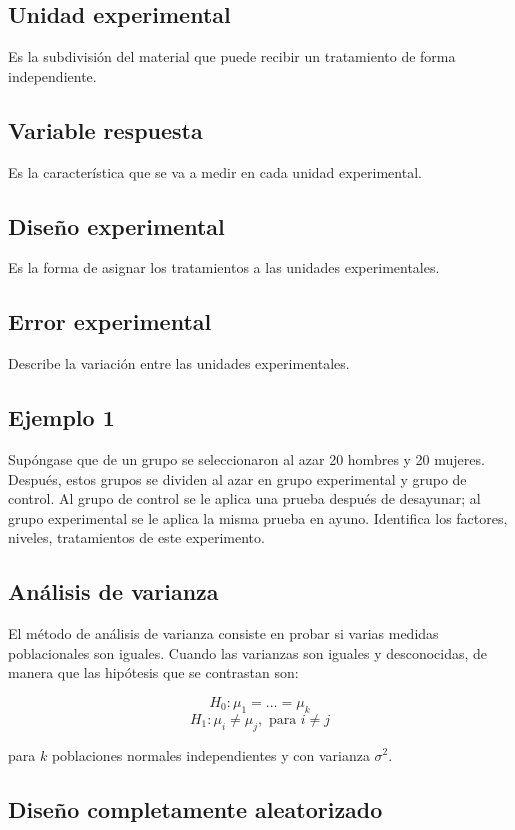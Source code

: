 \documentclass{article}
\begin{document}
\subsection*{Unidad experimental}
Es la subdivisión del material que puede recibir un tratamiento de forma independiente.

\subsection*{Variable respuesta}
Es la característica que se va a medir en cada unidad experimental.

\subsection*{Diseño experimental}
Es la forma de asignar los tratamientos a las unidades experimentales.

\subsection*{Error experimental}
Describe la variación entre las unidades experimentales.

\subsection*{Ejemplo 1}
Supóngase que de un grupo se seleccionaron al azar 20 hombres y 20 mujeres. Después, estos grupos se dividen al azar en grupo experimental y grupo de control. Al grupo de control se le aplica una prueba después de desayunar; al grupo experimental se le aplica la misma prueba en ayuno. Identifica los factores, niveles, tratamientos de este experimento.

\subsection{Análisis de varianza}

El método de análisis de varianza consiste en probar si varias medidas poblacionales son iguales. Cuando las varianzas son iguales y desconocidas, de manera que las hipótesis que se contrastan son:

\[H_0: \mu_1 = \dots = \mu_k\]
\[H_1: \mu_i \neq \mu_j, \text{ para } i\neq j\]

para \(k\) poblaciones normales independientes y con varianza \(\sigma^2\).

\subsection{Diseño completamente aleatorizado}
\end{document}
